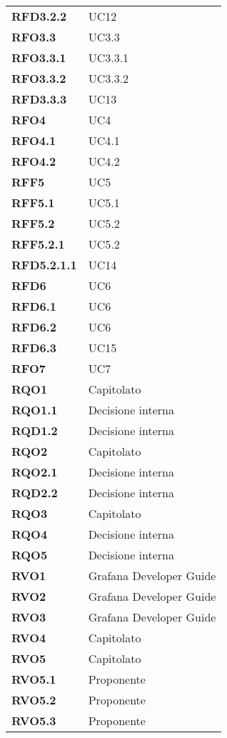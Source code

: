 \begin{longtable}[H]{>{\centering\bfseries}m{8cm} >{\centering\arraybackslash}m{8cm}}
  \textbf{RFD3.2.2} & UC12 \\
  \textbf{RFO3.3} & UC3.3 \\
  \textbf{RFO3.3.1} & UC3.3.1 \\
  \textbf{RFO3.3.2} & UC3.3.2 \\
  \textbf{RFD3.3.3} & UC13 \\
  \textbf{RFO4} & UC4 \\
  \textbf{RFO4.1} & UC4.1 \\
  \textbf{RFO4.2} & UC4.2 \\
  \textbf{RFF5} & UC5 \\
  \textbf{RFF5.1} & UC5.1 \\
  \textbf{RFF5.2} & UC5.2 \\
  \textbf{RFF5.2.1} & UC5.2 \\
  \textbf{RFD5.2.1.1} & UC14 \\
  \textbf{RFD6} & UC6 \\
  \textbf{RFD6.1} & UC6 \\
  \textbf{RFD6.2} & UC6 \\
  \textbf{RFD6.3} & UC15 \\
  \textbf{RFO7} & UC7 \\
  \textbf{RQO1} & Capitolato \\
  \textbf{RQO1.1} & Decisione interna \\
  \textbf{RQD1.2} & Decisione interna \\
  \textbf{RQO2} & Capitolato \\
  \textbf{RQO2.1} & Decisione interna \\
  \textbf{RQD2.2} & Decisione interna \\
  \textbf{RQO3} & Capitolato \\
  \textbf{RQO4} & Decisione interna \\
  \textbf{RQO5} & Decisione interna \\
  \textbf{RVO1} & Grafana Developer Guide \\
  \textbf{RVO2} & Grafana Developer Guide \\
  \textbf{RVO3} & Grafana Developer Guide \\
  \textbf{RVO4} & Capitolato \\
  \textbf{RVO5} & Capitolato \\
  \textbf{RVO5.1} & Proponente \\
  \textbf{RVO5.2} &	Proponente \\
  \textbf{RVO5.3} &	Proponente \\

\end{longtable}
